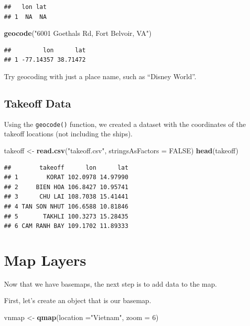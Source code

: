 \documentclass[oneside]{memoir}
\newenvironment{Shaded}{\begin{snugshade}}{\end{snugshade}}
\newcommand{\KeywordTok}[1]{\textcolor[rgb]{0.13,0.29,0.53}{\textbf{#1}}}
\newcommand{\DataTypeTok}[1]{\textcolor[rgb]{0.13,0.29,0.53}{#1}}
\newcommand{\DecValTok}[1]{\textcolor[rgb]{0.00,0.00,0.81}{#1}}
\newcommand{\StringTok}[1]{\textcolor[rgb]{0.31,0.60,0.02}{#1}}
\newcommand{\OtherTok}[1]{\textcolor[rgb]{0.56,0.35,0.01}{#1}}
\newcommand{\NormalTok}[1]{#1}
\theoremstyle{definition}
\theoremstyle{definition}
\theoremstyle{definition}
\theoremstyle{remark}
\begin{document}
\begin{verbatim}
##   lon lat
## 1  NA  NA
\end{verbatim}

\begin{Shaded}
\begin{Highlighting}[]
\KeywordTok{geocode}\NormalTok{(}\StringTok{"6001 Goethals Rd, Fort Belvoir, VA"}\NormalTok{)}
\end{Highlighting}
\end{Shaded}

\begin{verbatim}
##         lon      lat
## 1 -77.14357 38.71472
\end{verbatim}

Try geocoding with just a place name, such as ``Disney World''.

\section{Takeoff Data}\label{takeoff-data}

Using the \texttt{geocode()} function, we created a dataset with the
coordinates of the takeoff locations (not including the ships).

\begin{Shaded}
\begin{Highlighting}[]
\NormalTok{takeoff <-}\StringTok{ }\KeywordTok{read.csv}\NormalTok{(}\StringTok{"takeoff.csv"}\NormalTok{, }\DataTypeTok{stringsAsFactors =} \OtherTok{FALSE}\NormalTok{)}
\KeywordTok{head}\NormalTok{(takeoff)}
\end{Highlighting}
\end{Shaded}

\begin{verbatim}
##        takeoff      lon      lat
## 1        KORAT 102.0978 14.97990
## 2     BIEN HOA 106.8427 10.95741
## 3      CHU LAI 108.7038 15.41441
## 4 TAN SON NHUT 106.6588 10.81846
## 5       TAKHLI 100.3273 15.28435
## 6 CAM RANH BAY 109.1702 11.89333
\end{verbatim}

\chapter{Map Layers}\label{map-layers}

Now that we have basemaps, the next step is to add data to the map.

First, let's create an object that is our basemap.

\begin{Shaded}
\begin{Highlighting}[]
\NormalTok{vnmap <-}\StringTok{ }\KeywordTok{qmap}\NormalTok{(}\DataTypeTok{location =}\StringTok{"Vietnam"}\NormalTok{, }\DataTypeTok{zoom =} \DecValTok{6}\NormalTok{)}
\end{Highlighting}
\end{Shaded}
\end{document}
